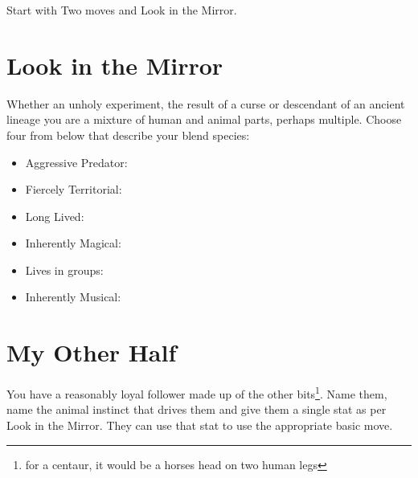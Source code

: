 \documentclass{tufte-book}
\begin{document}

Start with Two moves and Look in the Mirror.

\section{Look in the Mirror}
Whether an unholy experiment, the result of a curse or descendant of an ancient lineage you are a mixture of human and animal parts, perhaps multiple. Choose four from below that describe your blend species:
\begin{itemize}
\item Aggressive Predator: 
\item Fiercely Territorial: 
\item Long Lived: 
\item Inherently Magical: 
\item Lives in groups: 
\item Inherently Musical: 
\end{itemize}

\section{My Other Half} 
You have a reasonably loyal follower made up of the other bits\footnote{for a centaur, it would be a horses head on two human legs}. Name them, name the animal instinct that drives them and give them a single stat as per Look in the Mirror. They can use that stat to use the appropriate basic move.
\end{document}
